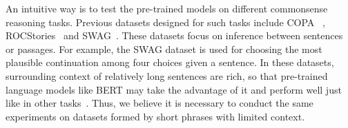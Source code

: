 An intuitive way %
is to test the pre-trained models on different commonsense reasoning tasks.
Previous datasets designed for such tasks include COPA ~\cite{roemmele2011choice}, ROCStories~\cite{mostafazadeh2016corpus} and SWAG~\cite{zellers2018swag}.
These datasets focus on inference between sentences or passages. 
For example, the SWAG dataset is used for choosing the most plausible continuation among four choices given a sentence.
In these datasets, 
surrounding context of relatively long sentences are rich, 
so that pre-trained language models like BERT may take the advantage 
of it and perform well just like in other tasks~\cite{devlin2018bert}.
Thus, we believe it is necessary to conduct the same experiments on datasets formed by short phrases with limited context.





